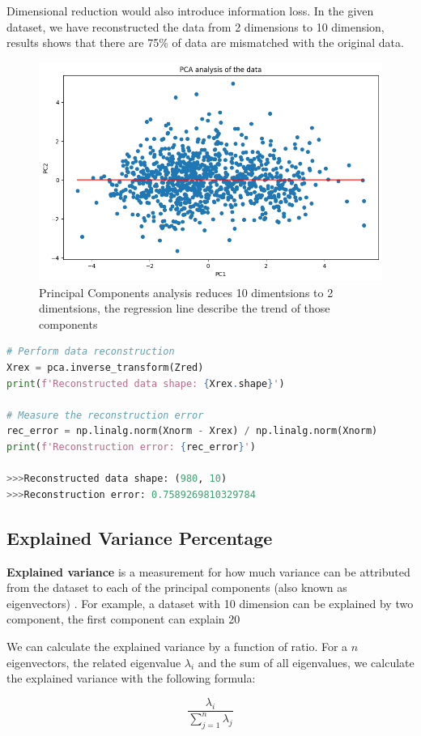 Dimensional reduction would also introduce information loss.
In the given dataset, we have reconstructed the data from 2 dimensions to 10 dimension, results shows that there are 75\% of data are mismatched with the original data.

\begin{figure}
    \centering
    \includegraphics[width=\textwidth]{Appendices/PCA-Reg.png}
    \caption{Principal Components analysis reduces 10 dimentsions to 2 dimentsions, the regression line describe the trend of those components}
    \label{Fig: PCA}
\end{figure}

\begin{lstlisting}[language=Python]
# Perform data reconstruction
Xrex = pca.inverse_transform(Zred)
print(f'Reconstructed data shape: {Xrex.shape}')

# Measure the reconstruction error
rec_error = np.linalg.norm(Xnorm - Xrex) / np.linalg.norm(Xnorm)
print(f'Reconstruction error: {rec_error}')

>>>Reconstructed data shape: (980, 10)
>>>Reconstruction error: 0.7589269810329784
\end{lstlisting}

\subsection{Explained Variance Percentage}

\textbf{Explained variance} is a measurement for how much variance can be attributed from the dataset to each of the principal components (also known as eigenvectors) \cite{o1982measures}.
For example, a dataset with 10 dimension can be explained by two component, the first component can explain 20%

We can calculate the explained variance by a function of ratio.
For a $n$ eigenvectors, the related eigenvalue $\lambda_i$ and the sum of all eigenvalues, we calculate the explained variance with the following formula:

\begin{equation}
    \frac{\lambda_i}{\sum^n_{j=1}\lambda_j}
\end{equation}

